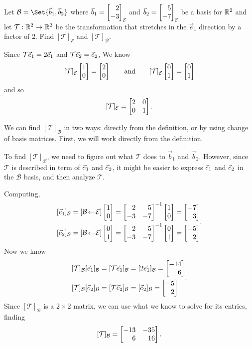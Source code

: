 \begin{example}
	Let $\mathcal B=\Set{\vec b_1,\vec b_2}$ where $\vec b_1=\mat{2\\-3}_{\mathcal E}$ and $\vec b_2=\mat{5\\-7}_{\mathcal E}$
	be a basis for $\mathbb{R}^2$ and let $\mathcal T:\mathbb{R}^2\to\mathbb{R}^2$ be the transformation that stretches in the $\vec e_1$ direction 
	by a factor of $2$. Find $[\mathcal T]_{\mathcal E}$ and $[\mathcal T]_{\mathcal B}$.

	Since $\mathcal T{\vec e_1}=2{\vec e_1}$ and $\mathcal T{\vec e_2}={\vec e_2}$, We know
	\[
		[\mathcal T]_{\mathcal E}\mat{1\\0}=\mat{2\\0}\qquad\text{and}\qquad
		[\mathcal T]_{\mathcal E}\mat{0\\1}=\mat{0\\1}
	\]
	and so
	\[
		[\mathcal T]_{\mathcal E}=\mat{2&0\\0&1}.
	\]

	We can find $[\mathcal T]_{\mathcal B}$ in two ways: directly from the definition, or by using change of basis matrices.
	First, we will work directly from the definition.

	To find $[\mathcal T]_{\mathcal B}$, we need to figure out what $\mathcal T$ does to $\vec b_1$ and $\vec b_2$.
	However, since $\mathcal T$ is described in term of ${\vec e_1}$ and ${\vec e_2}$, it might be easier to express ${\vec e_1}$ and
	${\vec e_2}$ in the $\mathcal B$ basis, and then analyze $\mathcal T$.

	Computing,
	\[
		\begin{aligned}
			[\xhat]_{\mathcal B} &= \BasisChange{\mathcal E}{\mathcal B}\mat{1\\0} = \mat{2&5\\-3&-7}^{-1}\mat{1\\0}=\mat{-7\\3}\\[0pt]
			[\yhat]_{\mathcal B} &= \BasisChange{\mathcal E}{\mathcal B}\mat{0\\1} = \mat{2&5\\-3&-7}^{-1}\mat{0\\1}=\mat{-5\\2}
		\end{aligned}.
	\]
	Now we know
	\[
		\begin{aligned}
			[\mathcal T]_{\mathcal B}[\xhat]_{\mathcal B}&=[\mathcal T\xhat]_{\mathcal B}=[2\xhat]_{\mathcal B}=\mat{-14\\6}\\[0pt]
			[\mathcal T]_{\mathcal B}[\yhat]_{\mathcal B}&=[\mathcal T\yhat]_{\mathcal B}=[\yhat]_{\mathcal B}=\mat{-5\\2}
		\end{aligned}.
	\]
	Since $[\mathcal T]_{\mathcal B}$ is a $2\times 2$ matrix, we can use what we know to solve for its entries, finding
	\[
		[\mathcal T]_{\mathcal B}=\mat{-13&-35\\6&16}.
	\]


\end{example}
